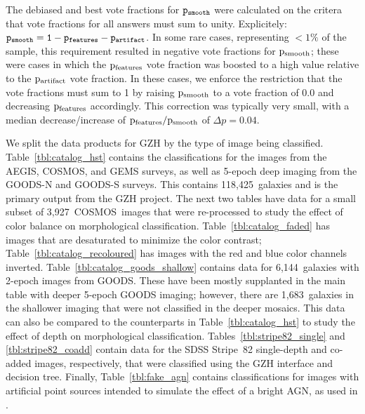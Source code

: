 \documentclass[twocolumn]{aastex6}
\begin{document}
The debiased and best vote fractions for $\tt p_{smooth}$ were calculated on the critera that vote fractions for all answers must sum to unity. Explicitely: $\tt p_{smooth} = 1 - p_{features} - p_{artifact}$. In some rare cases, representing  $<1\%$ of the sample, this requirement resulted in negative vote fractions for $\rm p_{smooth}$; these were cases in which the $\rm p_{features}$ vote fraction was boosted to a high value relative to the $\rm p_{artifact}$ vote fraction. In these cases, we enforce the restriction that the vote fractions must sum to 1 by raising $\rm p_{smooth}$ to a vote fraction of 0.0 and decreasing $\rm p_{features}$ accordingly. This correction was typically very small, with a median decrease/increase of $\rm p_{features}/p_{smooth}$ of $\Delta p = 0.04$.

We split the data products for GZH by the type of image being classified. Table~\ref{tbl:catalog_hst} contains the classifications for the \hst{} images from the AEGIS, COSMOS, and GEMS surveys, as well as 5-epoch deep imaging from the GOODS-N and GOODS-S surveys. This contains 118,425~galaxies and is the primary output from the GZH project. The next two tables have data for a small subset of 3,927~COSMOS~images that were re-processed to study the effect of color balance on morphological classification. Table~\ref{tbl:catalog_faded} has images that are desaturated to minimize the color contrast; Table~\ref{tbl:catalog_recoloured} has images with the red and blue color channels inverted. Table~\ref{tbl:catalog_goods_shallow} contains data for 6,144~galaxies with 2-epoch images from GOODS. These have been mostly supplanted in the main table with deeper 5-epoch GOODS imaging; however, there are 1,683~galaxies in the shallower imaging that were not classified in the deeper mosaics. This data can also be compared to the counterparts in Table~\ref{tbl:catalog_hst} to study the effect of depth on morphological classification. Tables~\ref{tbl:stripe82_single} and \ref{tbl:stripe82_coadd} contain data for the SDSS Stripe~82 single-depth and co-added images, respectively, that were classified using the GZH interface and decision tree. Finally, Table~\ref{tbl:fake_agn} contains classifications for images with artificial point sources intended to simulate the effect of a bright AGN, as used in \citet{sim14}.  
\end{document}

